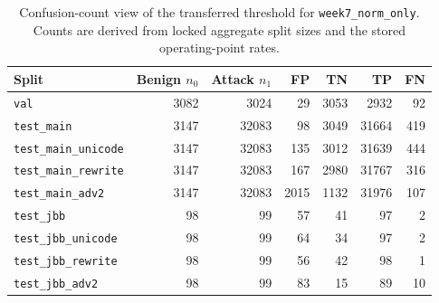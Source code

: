 \begin{table}[t]
\centering
\caption{Confusion-count view of the transferred threshold for \texttt{week7\_norm\_only}. Counts are derived from locked aggregate split sizes and the stored operating-point rates.}
\label{tab:confusion_counts}
\small
\begin{tabular}{lrrrrrr}
\toprule
Split & Benign $n_0$ & Attack $n_1$ & FP & TN & TP & FN \\
\midrule
\texttt{val} & 3082 & 3024 & 29 & 3053 & 2932 & 92 \\
\texttt{test\_main} & 3147 & 32083 & 98 & 3049 & 31664 & 419 \\
\texttt{test\_main\_unicode} & 3147 & 32083 & 135 & 3012 & 31639 & 444 \\
\texttt{test\_main\_rewrite} & 3147 & 32083 & 167 & 2980 & 31767 & 316 \\
\texttt{test\_main\_adv2} & 3147 & 32083 & 2015 & 1132 & 31976 & 107 \\
\texttt{test\_jbb} & 98 & 99 & 57 & 41 & 97 & 2 \\
\texttt{test\_jbb\_unicode} & 98 & 99 & 64 & 34 & 97 & 2 \\
\texttt{test\_jbb\_rewrite} & 98 & 99 & 56 & 42 & 98 & 1 \\
\texttt{test\_jbb\_adv2} & 98 & 99 & 83 & 15 & 89 & 10 \\
\bottomrule
\end{tabular}
\normalsize
\end{table}
